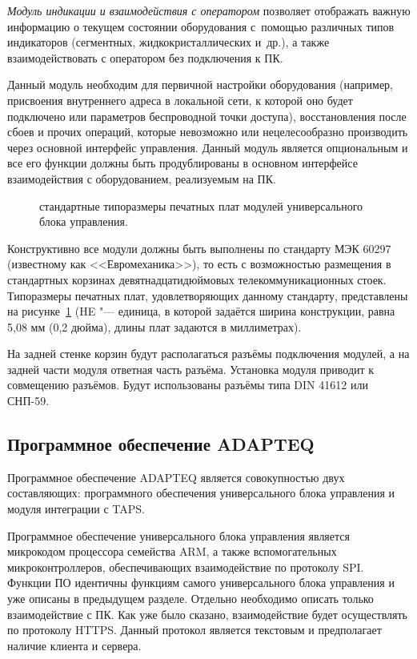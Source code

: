 \textit{Модуль индикации и взаимодействия с оператором} позволяет отображать важную информацию о текущем состоянии оборудования с~помощью различных типов индикаторов (сегментных, жидкокристаллических и~др.), а также взаимодействовать с оператором без подключения к ПК.

Данный модуль необходим для первичной настройки оборудования (например, присвоения внутреннего адреса в локальной сети, к которой оно будет подключено или параметров беспроводной точки доступа), восстановления после сбоев и прочих операций, которые невозможно или нецелесообразно производить через основной интерфейс управления. Данный модуль является опциональным и все его функции должны быть продублированы в основном интерфейсе взаимодействия с оборудованием, реализуемым на ПК.

\begin{figure}[ht]
	\caption{стандартные типоразмеры печатных плат модулей универсального блока управления.}\label{fig:euromech}
\end{figure}

Конструктивно все модули должны быть выполнены по стандарту МЭК 60297 (известному как <<Евромеханика>>), то есть с возможностью размещения в стандартных корзинах девятнадцатидюймовых телекоммуникационных стоек. Типоразмеры печатных плат, удовлетворяющих данному стандарту, представлены на рисунке~\cref{fig:euromech} (\foreignlanguage{english}{HE} "--- единица, в которой задаётся ширина конструкции, равна 5,08 мм (0,2 дюйма), длины плат задаются в миллиметрах).

На задней стенке корзин будут располагаться разъёмы подключения модулей, а на задней части модуля ответная часть разъёма. Установка модуля приводит к совмещению разъёмов. Будут использованы разъёмы типа DIN 41612 или СНП-59.

\subsection{Программное обеспечение \foreignlanguage{english}{ADAPTEQ}}

Программное обеспечение \foreignlanguage{english}{ADAPTEQ} является совокупностью двух составляющих: программного обеспечения универсального блока управления и модуля интеграции с \foreignlanguage{english}{TAPS}. 

Программное обеспечение универсального блока управления является микрокодом процессора семейства \foreignlanguage{english}{ARM}, а также вспомогательных микроконтроллеров, обеспечивающих взаимодействие по протоколу \foreignlanguage{english}{SPI}. Функции ПО идентичны функциям самого универсального блока управления и уже описаны в предыдущем разделе. Отдельно необходимо описать только взаимодействие с ПК. Как уже было сказано, взаимодействие будет осуществлять по протоколу \foreignlanguage{english}{HTTPS}. Данный протокол является текстовым и предполагает наличие клиента и сервера.

